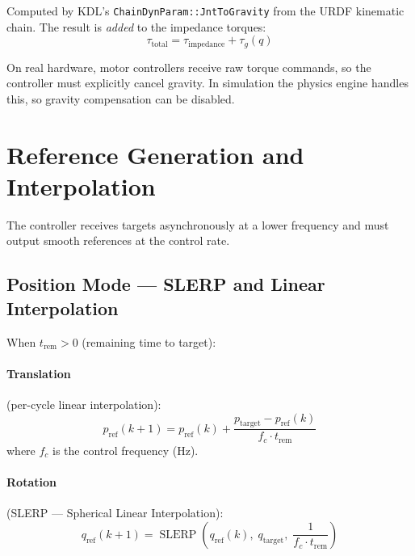 \documentclass[11pt,a4paper]{article}
\newcommand{\SLERP}{\operatorname{SLERP}}
\begin{document}
Computed by KDL's \texttt{ChainDynParam::JntToGravity} from the URDF kinematic
chain.  The result is \emph{added} to the impedance torques:
\[
  \tau_{\text{total}} = \tau_{\text{impedance}} + \tau_g(q)
\]

\begin{reasonbox}
On real hardware, motor controllers receive raw torque commands, so the
controller must explicitly cancel gravity.  In simulation the physics engine
handles this, so gravity compensation can be disabled.
\end{reasonbox}


\section{Reference Generation and Interpolation}
\label{sec:refgen}

The controller receives targets asynchronously at a lower frequency and must
output smooth references at the control rate.

\subsection{Position Mode --- SLERP and Linear Interpolation}
\label{sec:pos_interp}

When $t_{\text{rem}} > 0$ (remaining time to target):

\paragraph{Translation} (per-cycle linear interpolation):
\begin{equation}
  p_{\text{ref}}(k\!+\!1)
  = p_{\text{ref}}(k)
    + \frac{p_{\text{target}} - p_{\text{ref}}(k)}{f_c \cdot t_{\text{rem}}}
  \label{eq:lin_interp}
\end{equation}
where $f_c$ is the control frequency (Hz).

\paragraph{Rotation} (SLERP --- Spherical Linear Interpolation):
\begin{equation}
  q_{\text{ref}}(k\!+\!1)
  = \SLERP\!\!\left(q_{\text{ref}}(k),\; q_{\text{target}},\;
                     \frac{1}{f_c \cdot t_{\text{rem}}}\right)
  \label{eq:slerp}
\end{equation}
\end{document}
